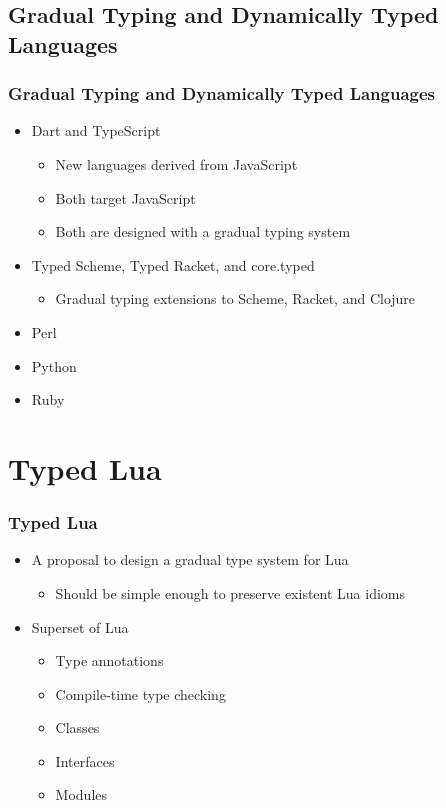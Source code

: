 \documentclass{beamer}
\begin{document}
\subsection{Gradual Typing and Dynamically Typed Languages}
\begin{frame}
\frametitle{Gradual Typing and Dynamically Typed Languages}
\begin{itemize}
\item Dart and TypeScript
\begin{itemize}
\item New languages derived from JavaScript
\item Both target JavaScript
\item Both are designed with a gradual typing system
\end{itemize}
\item Typed Scheme, Typed Racket, and core.typed
\begin{itemize}
\item Gradual typing extensions to Scheme, Racket, and Clojure
\end{itemize}
\item Perl
\item Python
\item Ruby
\end{itemize}
\end{frame}

\section{Typed Lua}
\begin{frame}
\frametitle{Typed Lua}
\begin{itemize}
\item A proposal to design a gradual type system for Lua
\begin{itemize}
\item Should be simple enough to preserve existent Lua idioms
\end{itemize}
\item Superset of Lua
\begin{itemize}
\item Type annotations
\item Compile-time type checking
\item Classes
\item Interfaces
\item Modules
\end{itemize}
\end{itemize}
\end{frame}
\end{document}
